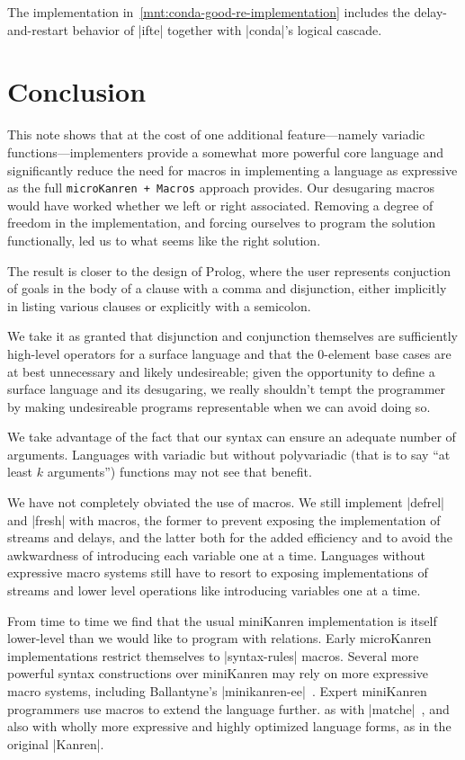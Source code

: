 \documentclass[sigplan,screen,draft,anonymous,review,natbib=false]{acmart}
\begin{document}
The implementation in~\cref{mnt:conda-good-re-implementation} includes
the delay-and-restart behavior of \rackinline|ifte| together with
\rackinline|conda|'s logical cascade.

\section{Conclusion}\label{sec:conclusion}

This note shows that at the cost of one additional feature---namely
variadic functions---implementers provide a somewhat more powerful
core language and significantly reduce the need for macros in
implementing a language as expressive as the full
\verb|microKanren + Macros| approach provides. Our desugaring macros
would have worked whether we left or right associated. Removing a
degree of freedom in the implementation, and forcing ourselves to
program the solution functionally, led us to what seems like the right
solution.

The result is closer to the design of Prolog, where the user
represents conjuction of goals in the body of a clause with a comma
and disjunction, either implicitly in listing various clauses or
explicitly with a semicolon.

We take it as granted that disjunction and conjunction themselves are
sufficiently high-level operators for a surface language and that the
0-element base cases are at best unnecessary and likely undesireable;
given the opportunity to define a surface language and its desugaring,
we really shouldn't tempt the programmer by making undesireable
programs representable when we can avoid doing so.

We take advantage of the fact that our syntax can ensure an
adequate number of arguments. Languages with variadic but without
polyvariadic (that is to say \enquote{at least $k$ arguments})
functions may not see that benefit.

We have not completely obviated the use of macros. We still implement
\rackinline|defrel| and \rackinline|fresh| with macros, the former to
prevent exposing the implementation of streams and delays, and the
latter both for the added efficiency and to avoid the awkwardness of
introducing each variable one at a time. Languages without expressive
macro systems still have to resort to exposing implementations of
streams and lower level operations like introducing
variables one at a time.

From time to time we find that the usual miniKanren implementation is
itself lower-level than we would like to program with relations. Early
microKanren implementations restrict themselves to
\rackinline|syntax-rules| macros. Several more powerful syntax
constructions over miniKanren may rely on more expressive macro
systems, including Ballantyne's
\rackinline|minikanren-ee|~\cite{ballantyne2020macros}. Expert
miniKanren programmers use macros to extend the language further. as
with \rackinline|matche|~\cite{keep2009pattern}, and also with wholly
more expressive and highly optimized language forms, as in the
original \rackinline|Kanren|.
\end{document}
